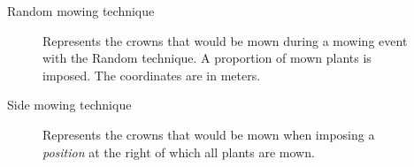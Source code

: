 \documentclass{myBeamer}
\begin{document}
\begin{frame}{Random mowing technique}
\begin{figure}[H] 
\caption{Represents the crowns that would be mown during a mowing event with the Random technique. A proportion of mown plants is imposed. The coordinates are in meters.}
\label{MTAlea}
\end{figure}
\end{frame}





\begin{frame}{Side mowing technique}
\begin{figure}[H]
\caption{Represents the crowns that would be mown when imposing a \emph{position} at the right of which all plants are mown.} 
\label{MTSideXPosition}
\end{figure}
\end{frame}



\end{document}
